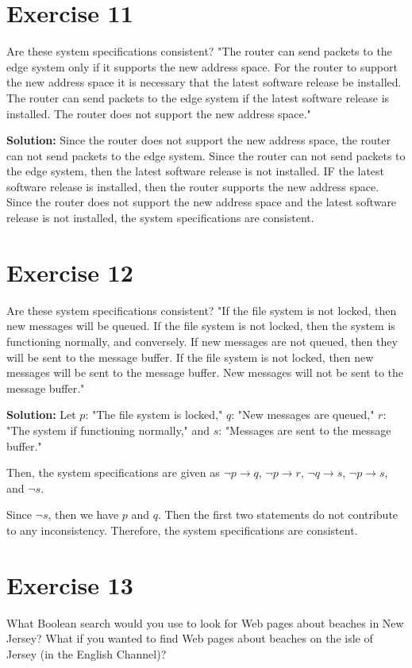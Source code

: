 \documentclass{Axon}
\begin{document}
\section*{Exercise 11}
Are these system specifications consistent? "The router can send packets to the edge system only if it supports the new address space. For the router to support the new address space it is necessary that the latest software release be installed. The router can send packets to the edge system if the latest software release is installed. The router does not support the new address space."

\noindent
\textbf{Solution:}
Since the router does not support the new address space, the router can not send packets to the edge system. Since the router can not send packets to the edge system, then the latest software release is not installed. IF the latest software release is installed, then the router supports the new address space. Since the router does not support the new address space and the latest software release is not installed, the system specifications are consistent.

\section*{Exercise 12}
Are these system specifications consistent? "If the file system is not locked, then new messages will be queued. If the file system is not locked, then the system is functioning normally, and conversely. If new messages are not queued, then they will be sent to the message buffer. If the file system is not locked, then new messages will be sent to the message buffer. New messages will not be sent to the message buffer."

\noindent
\textbf{Solution:}
Let \(p\): "The file system is locked," \(q\): "New messages are queued," \(r\): "The system if functioning normally," and \(s\): "Messages are sent to the message buffer."

Then, the system specifications are given as \(\lnot p \to q\), \(\lnot p \to r\), \(\lnot q \to s\), \(\lnot p \to s\), and \(\lnot s\).

Since \(\lnot s\), then we have \(p\) and \(q\). Then the first two statements do not contribute to any inconsistency. Therefore, the system specifications are consistent.

\section*{Exercise 13}
What Boolean search would you use to look for Web pages about beaches in New Jersey? What if you wanted to find Web pages about beaches on the isle of Jersey (in the English Channel)?
\end{document}
